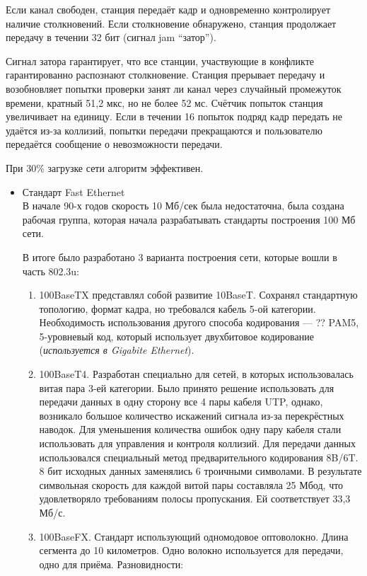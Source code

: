 \documentclass[12pt, russian, oneside, article]{ncc}
\begin{document}
Если канал свободен, станция передаёт кадр и одновременно контролирует наличие столкновений. Если столкновение обнаружено, станция продолжает передачу в течении 32 бит (сигнал jam ``затор'').

Сигнал затора гарантирует, что все станции, участвующие в конфликте гарантированно распознают столкновение. Станция прерывает передачу и возобновляет попытки проверки занят ли канал через случайный промежуток времени, кратный 51,2 мкс, но не более 52 мс. Счётчик попыток станция увеличивает на единицу. Если в течении 16 попыток подряд кадр передать не удаётся из-за коллизий, попытки передачи прекращаются и пользователю передаётся сообщение о невозможности передачи.

При 30\% загрузке сети алгоритм эффективен.
\begin{itemize}

\item Стандарт Fast Ethernet\\
\label{sec-5_2_1_1}%
В начале 90-х годов скорость 10 Мб/сек была недостаточна, была создана рабочая группа, которая начала разрабатывать стандарты построения 100 Мб сети.

В итоге было разработано 3 варианта построения сети, которые вошли в часть 802.3u:
\begin{enumerate}
\item 100BaseTX представлял собой развитие 10BaseT. Сохранял стандартную топологию, формат кадра, но требовался кабель 5-ой категории. Необходимость использования другого способа кодирования --- ?? PAM5, 5-уровневый код, который использует двухбитовое кодирование (\emph{используется в Gigabite Ethernet}).
\item 100BaseT4. Разработан специально для сетей, в которых использовалась витая пара 3-ей категории. Было принято решение использовать для передачи данных в одну сторону все 4 пары кабеля UTP, однако, возникало большое количество искажений сигнала из-за перекрёстных наводок. Для уменьшения количества ошибок одну пару кабеля стали использовать для управления и контроля коллизий. Для передачи данных использовался специальный метод предварительного кодирования 8B/6T. 8 бит исходных данных заменялись 6 троичными символами. В результате символьная скорость для каждой витой пары составляла 25 Мбод, что удовлетворяло требованиям полосы пропускания. Ей соответствует 33,3 Мб/с.
\item 100BaseFX. Стандарт использующий одномодовое оптоволокно. Длина сегмента до 10 километров. Одно волокно используется для передачи, одно для приёма. Разновидности:


\end{enumerate}
\end{itemize}
\end{document}
